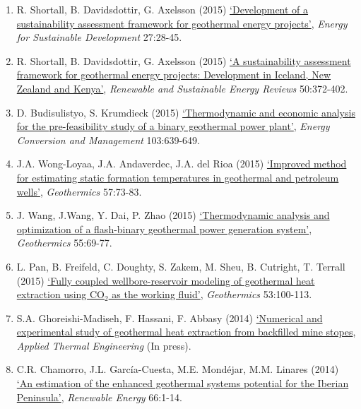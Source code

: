 \documentclass[12pts,a4paper]{report}%
\begin{document}
\begin{enumerate}[label=\bfseries Paper \arabic*:]
%
\item R. Shortall, B. Davidsdottir, G. Axelsson (2015) \href{http://dx.doi.org/10.1016/j.esd.2015.02.004}{`Development of a sustainability assessment framework for geothermal energy projects'}, {\it Energy for Sustainable Development} 27:28-45.
%
\item R. Shortall, B. Davidsdottir, G. Axelsson (2015) \href{http://dx.doi.org/10.1016/j.rser.2015.04.175}{`A sustainability assessment framework for geothermal energy projects: Development in Iceland, New Zealand and Kenya'}, {\it Renewable and Sustainable Energy Reviews} 50:372-402.
%
\item D. Budisulistyo, S. Krumdieck (2015) \href{http://dx.doi.org/10.1016/j.enconman.2015.06.069}{`Thermodynamic and economic analysis for the pre-feasibility study of a binary geothermal power plant'}, {\it Energy Conversion and Management} 103:639-649.
%
\item J.A. Wong-Loyaa, J.A. Andaverdec, J.A. del Rioa (2015) \href{http://dx.doi.org/10.1016/j.geothermics.2015.06.002}{`Improved method for estimating static formation temperatures in geothermal and petroleum wells'}, {\it Geothermics} 57:73-83.
%
\item J. Wang, J.Wang, Y. Dai, P. Zhao (2015) \href{http://dx.doi.org/10.1016/j.geothermics.2015.01.012}{`Thermodynamic analysis and optimization of a flash-binary geothermal power generation system'}, {\it Geothermics} 55:69-77.
%
\item L. Pan, B. Freifeld, C. Doughty, S. Zakem, M. Sheu, B. Cutright, T. Terrall (2015) \href{http://dx.doi.org/10.1016/j.geothermics.2014.05.005}{`Fully coupled wellbore-reservoir modeling of geothermal heat extraction using CO$_{2}$ as the working fluid'}, {\it Geothermics} 53:100-113.
%
\item S.A. Ghoreishi-Madiseh, F. Hassani, F. Abbasy (2014) \href{http://dx.doi.org/10.1016/j.applthermaleng.2014.11.023}{`Numerical and experimental study of geothermal heat extraction from backfilled mine stopes}, {\it Applied Thermal Engineering} (In press).
%
\item C.R. Chamorro, J.L. García-Cuesta, M.E. Mondéjar, M.M. Linares (2014) \href{http://dx.doi.org/10.1016/j.renene.2013.11.065}{`An estimation of the enhanced geothermal systems potential for the Iberian Peninsula'}, {\it Renewable Energy} 66:1-14.
%


%
\end{enumerate}




%  
\end{document}
